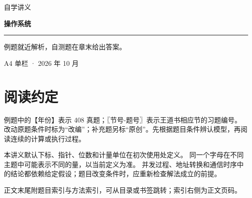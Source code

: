 
\newcommand{\BookTitle}{操作系统}

\begin{titlepage}
\thispagestyle{empty}
\vspace*{25mm}
{\sffamily\color{accent}\fontsize{16}{24} 自学讲义}\par
\vspace{15mm}
{\sffamily\bfseries\color{ink}\fontsize{32}{45}\selectfont 操作系统}\par
\vspace{15mm}
\noindent\rule{\textwidth}{0.5pt}\par
\vspace{5mm}
\noindent 例题就近解析，自测题在章末给出答案。\par
\vfill
\noindent A4 单栏 · 2026 年 10 月\par
\end{titlepage}
\tableofcontents
\clearpage
{}\chapter*{阅读约定}
例题中的【年份】表示 408 真题；〖节号-题号〗表示王道书相应节的习题编号。
改动原题条件时标为“改编”；补充题另标“原创”。先根据题目条件辨认模型，再阅读连续的计算或执行过程。

本讲义默认下标、指针、位数和计量单位在初次使用处定义。
同一个字母在不同主题中可能表示不同的量，以当前定义为准。
并发过程、地址转换和通信时序中的结论都依赖给定假设；题目改变条件时，应重新检查解法成立的前提。

正文末尾附题目索引与方法索引，可从目录或书签跳转；索引右侧为正文页码。
\clearpage
{}
\setcounter{chapter}{0}




